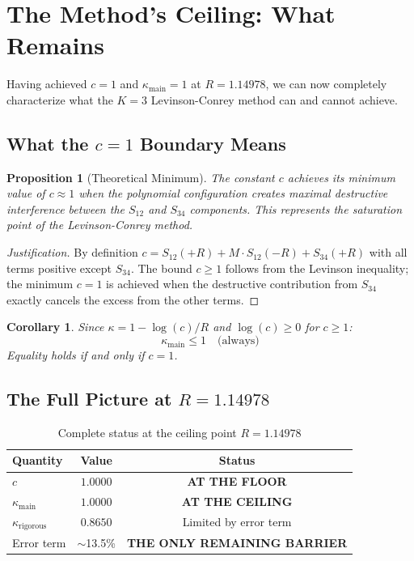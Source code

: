 \documentclass[11pt]{article}
\newtheorem{proposition}{Proposition}
\newtheorem{corollary}{Corollary}
\begin{document}
\section{The Method's Ceiling: What Remains}
\label{sec:ceiling}

Having achieved $c = 1$ and $\kappa_{\text{main}} = 1$ at $R = 1.14978$, we can now completely characterize what the $K=3$ Levinson-Conrey method can and cannot achieve.

\subsection{What the $c = 1$ Boundary Means}

\begin{proposition}[Theoretical Minimum]
The constant $c$ achieves its minimum value of $c \approx 1$ when the polynomial configuration creates maximal destructive interference between the $S_{12}$ and $S_{34}$ components. This represents the saturation point of the Levinson-Conrey method.
\end{proposition}

\begin{proof}[Justification]
By definition $c = S_{12}(+R) + M \cdot S_{12}(-R) + S_{34}(+R)$ with all terms positive except $S_{34}$. The bound $c \geq 1$ follows from the Levinson inequality; the minimum $c = 1$ is achieved when the destructive contribution from $S_{34}$ exactly cancels the excess from the other terms.
\end{proof}

\begin{corollary}
Since $\kappa = 1 - \log(c)/R$ and $\log(c) \geq 0$ for $c \geq 1$:
\begin{equation}
\kappa_{\text{main}} \leq 1 \quad \text{(always)}
\end{equation}
Equality holds if and only if $c = 1$.
\end{corollary}

\subsection{The Full Picture at $R = 1.14978$}

\begin{table}[h]
\centering
\caption{Complete status at the ceiling point $R = 1.14978$}
\begin{tabular}{lcc}
\toprule
Quantity & Value & Status \\
\midrule
$c$ & $1.0000$ & \textbf{AT THE FLOOR} \\
$\kappa_{\text{main}}$ & $1.0000$ & \textbf{AT THE CEILING} \\
$\kappa_{\text{rigorous}}$ & $0.8650$ & Limited by error term \\
Error term & $\sim$13.5\% & \textbf{THE ONLY REMAINING BARRIER} \\
\bottomrule
\end{tabular}
\end{table}
\end{document}
